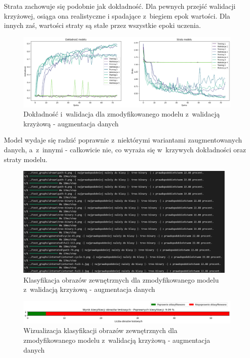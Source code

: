Strata zachowuje się podobnie jak dokładność. Dla pewnych przejść walidacji krzyżowej, osiąga ona realistyczne
i spadające z~biegiem epok wartości. Dla innych zaś, wartości straty są stałe przez wszystkie epoki uczenia.

\begin{figure}[ht]
	\centering
	\includegraphics[width=15.5cm]{resources/tests/images/v4/crossvalid_3_img.png}
	\caption{Dokładność i~walidacja dla zmodyfikowanego modelu z~walidacją krzyżową - augmentacja danych}
	\label{Fig:tests-cv-3a}
\end{figure}
\FloatBarrier

Model wydaje się radzić poprawnie z~niektórymi wariantami zaugmentowanych danych, a~z~innymi - całkowicie nie,
co wyraża się w~krzywych dokładności oraz straty modelu.

\begin{figure}[ht]
	\centering
	\includegraphics[height=5.5cm]{resources/tests/images/v4/crossvalid_3_txt.png}
	\caption{Klasyfikacja obrazów zewnętrznych dla zmodyfikowanego modelu z~walidacją krzyżową - augmentacja danych}
	\label{Fig:tests-cv-3b}
\end{figure}
\FloatBarrier

\begin{figure}[ht]
	\centering
	\includegraphics[width=15.5cm]{resources/tests/images/v4/crossvalid_3_bar.png}
	\caption{Wizualizacja klasyfikacji obrazów zewnętrznych dla zmodyfikowanego modelu z~walidacją krzyżową - augmentacja danych}
	\label{Fig:tests-cv-3c}
\end{figure}
\FloatBarrier

